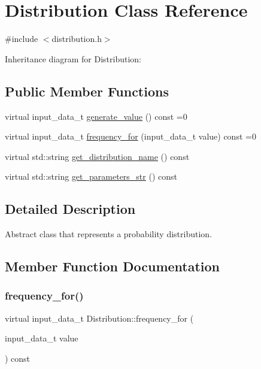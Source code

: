 \hypertarget{classDistribution}{}\section{Distribution Class Reference}
\label{classDistribution}


{\ttfamily \#include $<$distribution.\+h$>$}



Inheritance diagram for Distribution\+:
\subsection*{Public Member Functions}
\begin{DoxyCompactItemize}
\item 
virtual input\+\_\+data\+\_\+t \hyperlink{classDistribution_a096af8a5e59bd38e0ad7da10632e0c83}{generate\+\_\+value} () const =0
\item 
virtual input\+\_\+data\+\_\+t \hyperlink{classDistribution_a5146d1193531b15a872d401cb97f06ca}{frequency\+\_\+for} (input\+\_\+data\+\_\+t value) const =0
\item 
virtual std\+::string \hyperlink{classDistribution_a478a0c7b72d3ad266a2b6f1b9ed20fe9}{get\+\_\+distribution\+\_\+name} () const
\item 
virtual std\+::string \hyperlink{classDistribution_a716b7df9facb6bb016f46ac130297f9c}{get\+\_\+parameters\+\_\+str} () const
\end{DoxyCompactItemize}


\subsection{Detailed Description}
Abstract class that represents a probability distribution. 

\subsection{Member Function Documentation}
\mbox{\label{classDistribution_a5146d1193531b15a872d401cb97f06ca}} 
\subsubsection{\texorpdfstring{frequency\+\_\+for()}{frequency\_for()}}
{\footnotesize\ttfamily virtual input\+\_\+data\+\_\+t Distribution\+::frequency\+\_\+for (\begin{DoxyParamCaption}\item[{input\+\_\+data\+\_\+t}]{value }\end{DoxyParamCaption}) const\hspace{0.3cm}{\ttfamily [pure virtual]}}

